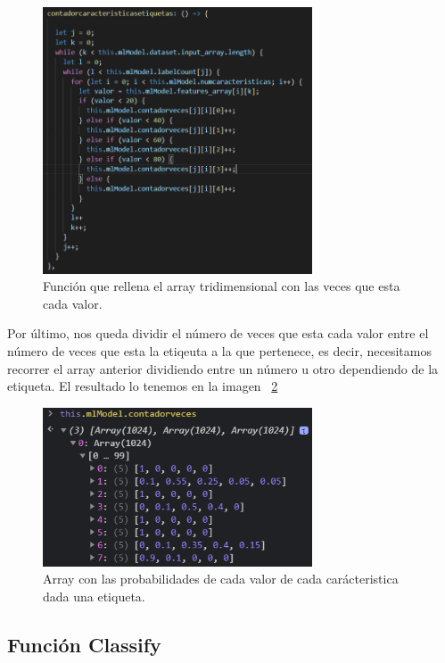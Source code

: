 \documentclass[a4paper, 12pt]{book}
\begin{document}
\begin{figure}
	\centering
	\includegraphics[width=8cm, keepaspectratio]{img/funcioncontador}
	\caption{Función que rellena el array tridimensional con las veces que esta cada valor.}			
	\label{fig:funcioncontador}
\end{figure}

Por último, nos queda dividir el número de veces que esta cada valor entre el número de veces que esta la etiqeuta a la que pertenece, es decir, necesitamos recorrer el array anterior dividiendo entre un número u otro dependiendo de la etiqueta. El resultado lo tenemos en la imagen ~\ref{fig:probabilidadescalculadas}

\begin{figure}
	\centering
	\includegraphics[width=8cm, keepaspectratio]{img/probabilidadescalculadas}
	\caption{Array con las probabilidades de cada valor de cada carácteristica dada una etiqueta.}			
	\label{fig:probabilidadescalculadas}
\end{figure}


\subsection{Función Classify} 
\label{sec:funcionclassifybayes}
\end{document}
